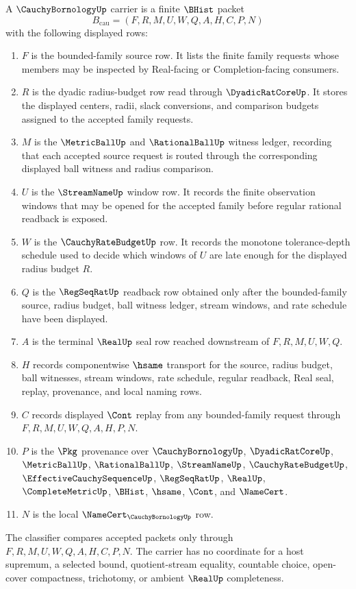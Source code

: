 \begin{definition}
\label{def:cauchy-bornology-carrier}
A $\CauchyBornologyUp$ carrier is a finite $\BHist$ packet
$$
B_{\mathrm{cau}}=(F,R,M,U,W,Q,A,H,C,P,N)
$$
with the following displayed rows:
\begin{enumerate}
\item $F$ is the bounded-family source row. It lists the finite family requests whose members may be inspected by Real-facing or Completion-facing consumers.
\item $R$ is the dyadic radius-budget row read through $\DyadicRatCoreUp$. It stores the displayed centers, radii, slack conversions, and comparison budgets assigned to the accepted family requests.
\item $M$ is the $\MetricBallUp$ and $\RationalBallUp$ witness ledger, recording that each accepted source request is routed through the corresponding displayed ball witness and radius comparison.
\item $U$ is the $\StreamNameUp$ window row. It records the finite observation windows that may be opened for the accepted family before regular rational readback is exposed.
\item $W$ is the $\CauchyRateBudgetUp$ row. It records the monotone tolerance-depth schedule used to decide which windows of $U$ are late enough for the displayed radius budget $R$.
\item $Q$ is the $\RegSeqRatUp$ readback row obtained only after the bounded-family source, radius budget, ball witness ledger, stream windows, and rate schedule have been displayed.
\item $A$ is the terminal $\RealUp$ seal row reached downstream of $F,R,M,U,W,Q$.
\item $H$ records componentwise $\hsame$ transport for the source, radius budget, ball witnesses, stream windows, rate schedule, regular readback, Real seal, replay, provenance, and local naming rows.
\item $C$ records displayed $\Cont$ replay from any bounded-family request through $F,R,M,U,W,Q,A,H,P,N$.
\item $P$ is the $\Pkg$ provenance over $\CauchyBornologyUp$, $\DyadicRatCoreUp$, $\MetricBallUp$, $\RationalBallUp$, $\StreamNameUp$, $\CauchyRateBudgetUp$, $\EffectiveCauchySequenceUp$, $\RegSeqRatUp$, $\RealUp$, $\CompleteMetricUp$, $\BHist$, $\hsame$, $\Cont$, and $\NameCert$.
\item $N$ is the local $\NameCert_{\CauchyBornologyUp}$ row.
\end{enumerate}
The classifier compares accepted packets only through $F,R,M,U,W,Q,A,H,C,P,N$. The carrier has no coordinate for a host supremum, a selected bound, quotient-stream equality, countable choice, open-cover compactness, trichotomy, or ambient $\RealUp$ completeness.
\end{definition}

